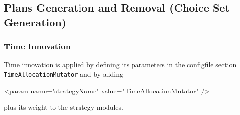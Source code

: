 %


\subsection{Plans Generation and Removal (Choice Set Generation)}
\label{sec:configuring-choice-set-generation}

\subsubsection{Time Innovation}
\label{sec:timechoice}
Time innovation is applied by defining its parameters in the \gls{configfile} section \lstinline|TimeAllocationMutator| and by adding 
%
\begin{xml}
	<param name="strategyName" value="TimeAllocationMutator" />
\end{xml}
%
plus its weight to the strategy modules.

